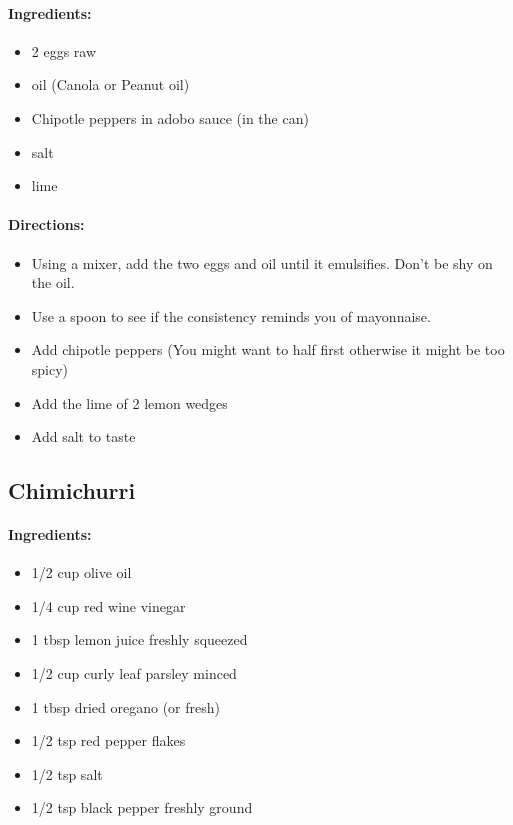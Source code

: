 \documentclass{article}
\begin{document}
\paragraph{Ingredients:}
\begin{itemize}
    \item 2 eggs raw
    \item oil (Canola or Peanut oil)
    \item Chipotle peppers in adobo sauce (in the can)
    \item salt
    \item lime
\end{itemize}

\paragraph{Directions:}
\begin{itemize}
    \item Using a mixer, add the two eggs and oil until it emulsifies. Don't be shy on the oil.
    \item Use a spoon to see if the consistency reminds you of mayonnaise.
    \item Add chipotle peppers (You might want to half first otherwise it might be too spicy)
    \item Add the lime of 2 lemon wedges
    \item Add salt to taste
\end{itemize}

\subsection{Chimichurri}

\paragraph{Ingredients:}
\begin{itemize}
    \item 1/2 cup olive oil
    \item 1/4 cup red wine vinegar
    \item 1 tbsp lemon juice freshly squeezed
    \item 1/2 cup curly leaf parsley minced
    \item 1 tbsp dried oregano (or fresh)
    \item 1/2 tsp red pepper flakes
    \item 1/2 tsp salt
    \item 1/2 tsp black pepper freshly ground
\end{itemize}
\end{document}
